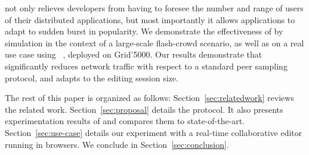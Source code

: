 \SPRAY not only relieves developers from having to foresee the number
and range of users of their distributed applications, but most
importantly it allows applications to adapt to sudden burst in
popularity. We demonstrate the effectiveness of \SPRAY by simulation
in the context of a large-scale flash-crowd scenario, as well as on a
real use case using \CRATE~\cite{nedelec2016crate}, deployed on
Grid'5000. Our results demonstrate that \SPRAY significantly reduces
network traffic with respect to a standard peer sampling protocol, and
adapts to the editing session size.


The rest of this paper is organized as follows: Section~\ref{sec:relatedwork}
reviews the related work. Section~\ref{sec:proposal} details the \SPRAY
protocol. It also presents experimentation results of \SPRAY and compares them
to state-of-the-art. Section~\ref{sec:use-case} details our experiment with
\CRATE a real-time collaborative editor running in browsers. We conclude in
Section~\ref{sec:conclusion}.

